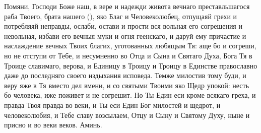 \mychapterending

\begin{mymulticols}
 

Помяни, Господи Боже наш, в вере и надежди живота вечнаго преставльшагося раба Твоего, брата нашего (), яко Благ и Человеколюбец, отпущаяй грехи и потребляяй неправды, ослаби, остави и прости вся вольная его согрешения и невольная, избави его вечныя муки и огня геенскаго, и даруй ему причастие и наслаждение вечных Твоих благих, уготованных любящым Тя: аще бо и согреши, но не отступи от Тебе, и несумненно во Отца и Сына и Святаго Духа, Бога Тя в Троице славимаго, верова, и Единицу в Троицу и Троицу в Единстве православно даже до последняго своего издыхания исповеда. Темже милостив тому буди, и веру яже в Тя вместо дел вмени, и со святыми Твоими яко Щедр упокой: несть бо человека, иже поживет и не согрешит. Но Ты Един еси кроме всякаго греха, и правда Твоя правда во веки, и Ты еси Един Бог милостей и щедрот, и человеколюбия, и Тебе славу возсылаем, Отцу и Сыну и Святому Духу, ныне и присно и во веки веков. Аминь. 

\end{mymulticols}

\mychapterending


\vspace{-\baselineskip}

